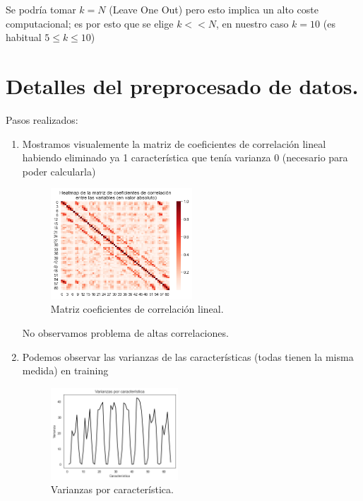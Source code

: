 \documentclass[11pt,a4paper]{article}
\theoremstyle{definition}
\begin{document}
	  Se podría tomar $k=N$ (Leave One Out) pero esto implica un alto coste computacional; es por esto que se elige $k<< N$, en nuestro caso $k=10$ (es habitual $5\leq k\leq 10$)
	\section{Detalles del preprocesado de datos.}
	Pasos realizados:
	\begin{enumerate}
		\item Mostramos visualemente la matriz de coeficientes de correlación lineal habiendo eliminado ya 1 característica que tenía varianza 0 (necesario para poder calcularla)
		\begin{figure}[H]
		\centering
		\includegraphics[width=0.5\textwidth]{images/corr_matrix}
		\caption{Matriz coeficientes de correlación lineal.}
		\end{figure}
		No observamos problema de altas correlaciones.
		
		\item Podemos observar las varianzas de las características (todas tienen la misma medida) en training
		
		\begin{figure}[H]
		\centering
		\includegraphics[width=0.45\textwidth]{images/var_caract}
		\caption{Varianzas por característica.}
		\end{figure}
		

\end{enumerate}
\end{document}
